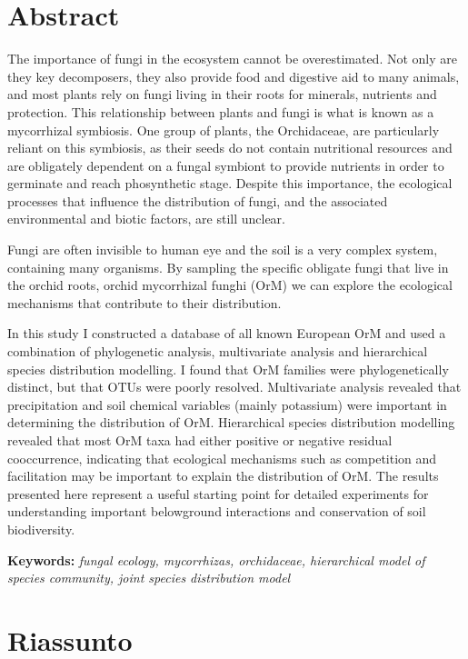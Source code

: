\def\bibliocommand{}


\chapter{Abstract}
\label{abstract}

The importance of fungi in the ecosystem cannot be overestimated. Not only are they key decomposers, they also provide food and digestive aid to many animals, and most plants rely on fungi living in their roots for minerals, nutrients and protection. This relationship between plants and fungi is what is known as a mycorrhizal symbiosis. One group of plants, the Orchidaceae, are particularly reliant on this symbiosis, as their seeds do not contain nutritional resources and are obligately dependent on a fungal symbiont to provide nutrients in order to germinate and reach phosynthetic stage. Despite this importance, the ecological processes that influence the distribution of fungi, and the associated environmental and biotic factors, are still unclear.

Fungi are often invisible to human eye and the soil is a very complex system, containing many organisms. By sampling the specific obligate fungi that live in the orchid roots, orchid mycorrhizal funghi (OrM) we can explore the ecological mechanisms that contribute to their distribution.

In this study I constructed a database of all known European OrM and used a combination of phylogenetic analysis, multivariate analysis and hierarchical species distribution modelling. I found that OrM families were phylogenetically distinct, but that OTUs were poorly resolved. Multivariate analysis revealed that precipitation and soil chemical variables (mainly potassium) were important in determining the distribution of OrM. Hierarchical species distribution modelling revealed that most OrM taxa had either positive or negative residual cooccurrence, indicating that ecological mechanisms such as competition and facilitation may be important to explain the distribution of OrM. The results presented here represent a useful starting point for detailed experiments for understanding important belowground interactions and conservation of soil biodiversity.

\textbf{Keywords:} \emph{fungal ecology, mycorrhizas, orchidaceae, hierarchical model of species community, joint species distribution model}

\chapter{Riassunto}
\label{riassunto}

